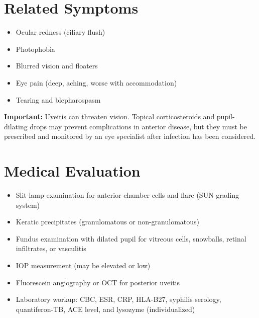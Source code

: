\section*{Related Symptoms}
\begin{itemize}
  \item Ocular redness (ciliary flush)
  \item Photophobia
  \item Blurred vision and floaters
  \item Eye pain (deep, aching, worse with accommodation)
  \item Tearing and blepharospasm
\end{itemize}
\textbf{Important:} Uveitis can threaten vision. Topical corticosteroids and pupil-dilating drops may prevent complications in anterior disease, but they must be prescribed and monitored by an eye specialist after infection has been considered.

\section*{Medical Evaluation}
\begin{itemize}
  \item Slit-lamp examination for anterior chamber cells and flare (SUN grading system)
  \item Keratic precipitates (granulomatous or non-granulomatous)
  \item Fundus examination with dilated pupil for vitreous cells, snowballs, retinal infiltrates, or vasculitis
  \item IOP measurement (may be elevated or low)
  \item Fluorescein angiography or OCT for posterior uveitis
  \item Laboratory workup: CBC, ESR, CRP, HLA-B27, syphilis serology, quantiferon-TB, ACE level, and lysozyme (individualized)
\end{itemize}

